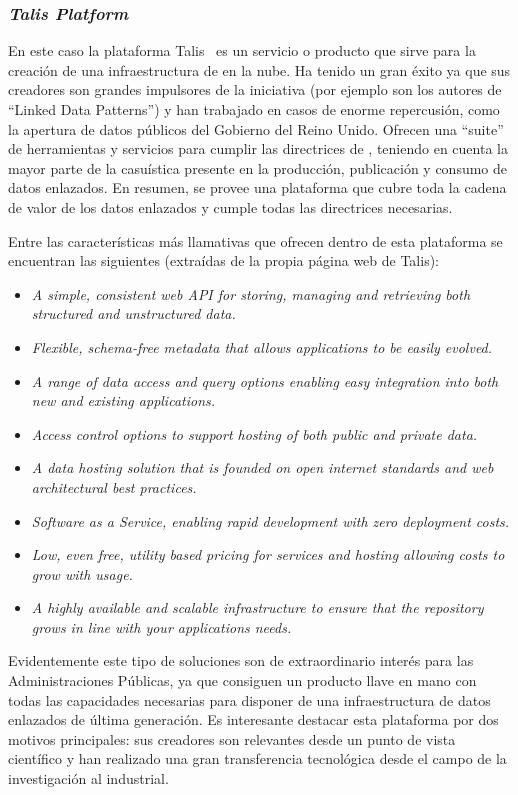 \subsubsection{\textit{Talis Platform}}
En este caso la plataforma Talis~\cite{talis} es un servicio o producto que sirve para la creación de una
infraestructura de \linkeddata en la nube. Ha tenido un gran éxito ya que sus creadores son grandes
impulsores de la iniciativa (por ejemplo son los autores de ``Linked Data Patterns'') y han trabajado
en casos de enorme repercusión, como la apertura de datos públicos del Gobierno del Reino Unido. Ofrecen 
 una ``suite'' de herramientas y servicios para cumplir las directrices de \linkeddata, teniendo en cuenta 
la mayor parte de la casuística presente en la producción, publicación y consumo de datos enlazados. En resumen, se provee una plataforma
que cubre toda la cadena de valor de los datos enlazados y cumple todas las directrices necesarias.

Entre las características más llamativas que ofrecen dentro de esta plataforma se encuentran las
siguientes (extraídas de la propia página web de Talis):

\begin{itemize}
    \item \textit{A simple, consistent web API for storing, managing and retrieving both structured and unstructured data.}
    \item \textit{Flexible, schema-free metadata that allows applications to be easily evolved.}
    \item \textit{A range of data access and query options enabling easy integration into both new and existing applications.}
    \item \textit{Access control options to support hosting of both public and private data.}
    \item \textit{A data hosting solution that is founded on open internet standards and web architectural best practices.}
    \item \textit{Software as a Service, enabling rapid development with zero deployment costs.}
    \item \textit{Low, even free, utility based pricing for services and hosting allowing costs to grow with usage.}
    \item \textit{A highly available and scalable infrastructure to ensure that the repository grows in line with your applications needs.}
\end{itemize}

Evidentemente este tipo de soluciones son de extraordinario interés para las Administraciones Públicas, ya que consiguen
un producto llave en mano con todas las capacidades necesarias para disponer de una infraestructura de datos
enlazados de última generación. Es interesante destacar esta plataforma por dos motivos principales: sus creadores
son relevantes desde un punto de vista científico y han realizado una gran transferencia tecnológica desde
el campo de la investigación al industrial.

